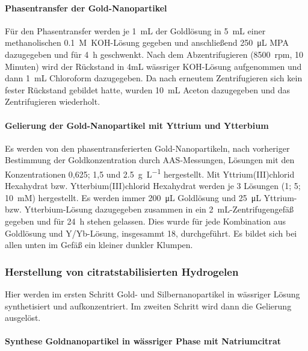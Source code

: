 			\paragraph{Phasentransfer der Gold-Nanopartikel}
		
			Für den Phasentransfer werden je \SI{1}{\milli\liter} der Goldlösung in \SI{5}{\milli\liter} einer methanolischen \SI{0,1}{M}~KOH-Lösung gegeben und anschließend \SI{250}{\micro\liter} MPA dazugegeben und für \SI{4}{\hour} geschwenkt.
			Nach dem Abzentrifugieren (8500~rpm, 10 Minuten) wird der Rückstand in 4mL wässriger KOH-Lösung aufgenommen und dann \SI{1}{\milli\liter} Chloroform dazugegeben. 
			Da nach erneutem Zentrifugieren sich kein fester Rückstand gebildet hatte, wurden \SI{10}{\milli\liter} Aceton dazugegeben und das Zentrifugieren wiederholt.
				
			\paragraph{Gelierung der Gold-Nanopartikel mit Yttrium und Ytterbium}
				
			Es werden von den phasentransferierten Gold-Nanopartikeln, nach vorheriger Bestimmung der Goldkonzentration durch AAS-Messungen, Lösungen mit den Konzentrationen 0,625; 1,5 und \SI{2,5}{\gram\per\liter} hergestellt.
			Mit Yttrium(III)chlorid Hexahydrat bzw. Ytterbium(III)chlorid Hexahydrat werden je 3 Lösungen (1; 5; \SI{10}{mM}) hergestellt.
			Es werden immer \SI{200}{\micro\liter} Goldlösung und \SI{25}{\micro\liter} Yttrium- bzw. Ytterbium-Lösung dazugegeben zusammen in ein \SI{2}{\milli\liter}-Zentrifugengefäß gegeben und für \SI{24}{\hour} stehen gelassen.
			Dies wurde für jede Kombination aus Goldlösung und Y/Yb-Lösung, insgesammt 18, durchgeführt.
			Es bildet sich bei allen unten im Gefäß ein kleiner dunkler Klumpen.
			  
		\subsubsection{Herstellung von citratstabilisierten Hydrogelen}
			Hier werden im ersten Schritt Gold- und Silbernanopartikel in wässriger Lösung synthetisiert und aufkonzentriert.
			Im zweiten Schritt wird dann die Gelierung ausgelöst. \autocite{Bigall2009} 
		 
			\paragraph{Synthese Goldnanopartikel in wässriger Phase mit Natriumcitrat}
			

